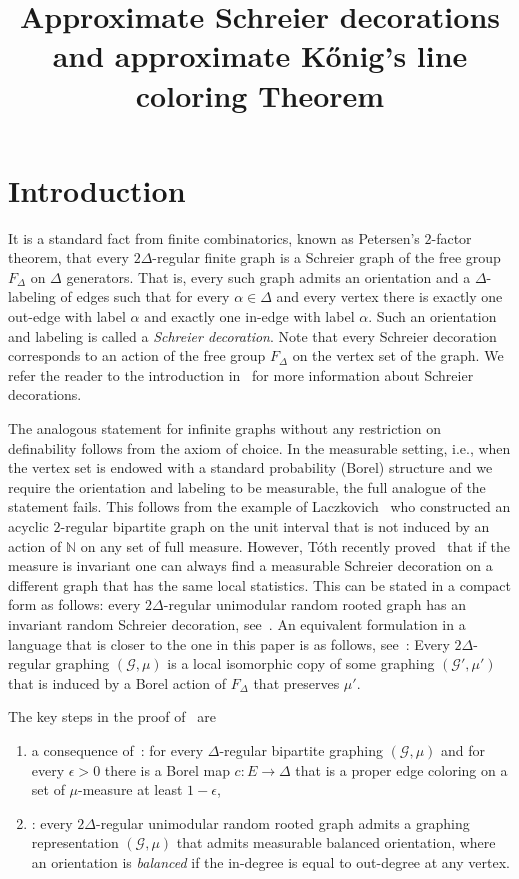 \documentclass[AHL,Unicode,longabstracts,published]{cedram}
\title[Approximate Schreier decorations and approximate K{\H o}nig's line coloring Theorem]{Approximate Schreier decorations and approximate K{\H o}nig's line coloring Theorem}
\author[\initial{J.} \lastname{Greb{\'I}k}]{\firstname{Jan} \lastname{Greb{\'I}k}}
\newcommand{\clG}{\mathcal{G}}
\newcommand{\bbZ}{\mathbb{N}}
\newcommand*{\Romanenumi}{\renewcommand*{\theenumi}{\Roman{enumi}}}
\newcommand{\clG}{\mathcal{G}}
\begin{document}
\maketitle


\section{Introduction}

It is a standard fact from finite combinatorics, known as Petersen's $2$-factor theorem, that every $2\Delta$-regular finite graph is a Schreier graph of the free group $F_\Delta$ on $\Delta$ generators. That is, every such graph admits an orientation and a $\Delta$-labeling of edges such that for every $\alpha\in \Delta$ and every vertex there is exactly one out-edge with label $\alpha$ and exactly one in-edge with label $\alpha$. Such an orientation and labeling is called a \emph{Schreier decoration}. Note that every Schreier decoration corresponds to an action of the free group $F_{\Delta}$ on the vertex set of the graph. We refer the reader to the introduction in~\cite{Laszlo} for more information about Schreier decorations.

The analogous statement for infinite graphs without any restriction on definability follows from the axiom of choice. In the measurable setting, i.e., when the vertex set is endowed with a standard probability (Borel) structure and we require the orientation and labeling to be measurable, the full analogue of the statement fails. This follows from the example of Laczkovich~\cite{Laczkovich} who constructed an acyclic $2$-regular bipartite graph on the unit interval that is not induced by an action of $\bbZ$ on any set of full measure. However, Tóth recently proved~\cite{Laszlo} that if the measure is invariant one can always find a measurable Schreier decoration on a different graph that has the same local statistics. This can be stated in a compact form as follows: every $2\Delta$-regular unimodular random rooted graph has an invariant random Schreier decoration, see~\cite[Theorem~1]{Laszlo}. An equivalent formulation in a language that is closer to the one in this paper is as follows, see~\cite[Corollary~4]{Laszlo}: Every $2\Delta$-regular graphing $(\clG,\mu)$ is a local isomorphic copy of some graphing $(\clG',\mu')$ that is induced by a Borel action of $F_\Delta$ that preserves $\mu'$.

The key steps in the proof of~\cite[Theorem~1]{Laszlo} are
\begin{enumerate}\Romanenumi
\item\label{IntroI} a consequence of~\cite[Theorem~3]{Laszlo}: for every $\Delta$-regular bipartite graphing $(\clG,\mu)$ and for every $\epsilon>0$ there is a Borel map $c:E\to \Delta$ that is a proper edge coloring on a set of $\mu$-measure at least $1-\epsilon$,
\item\label{IntroII} \cite[Theorem~2]{Laszlo}: every $2\Delta$-regular unimodular random rooted graph admits a graphing representation $(\clG,\mu)$ that admits measurable balanced orientation, where an orientation is \emph{balanced} if the in-degree is equal to out-degree at any vertex.
\end{enumerate}
\end{document}
